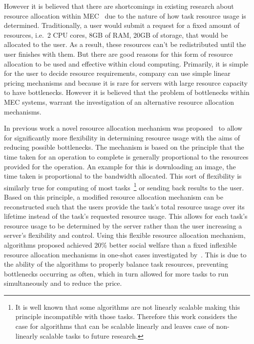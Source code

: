 However it is believed that there are shortcomings in existing research about resource allocation within
MEC~\citep{vaji_infocom, Bi2019} due to the nature of how task resource usage is determined. Traditionally,
a user would submit a request for a fixed amount of resources, i.e.\ 2 CPU cores, 8GB of RAM, 20GB of storage, that
would be allocated to the user. As a result, these resources can't be redistributed until the user finishes with them.
But there are good reasons for this form of resource allocation to be used and effective within cloud computing.
Primarily, it is simple for the user to decide resource requirements, company can use simple linear pricing mechanisms
and because it is rare for servers with large resource capacity to have bottlenecks. However it is believed that the
problem of bottlenecks within MEC systems, warrant the investigation of an alternative resource allocation mechanisms.

In previous work a novel resource allocation mechanism was proposed~\citep{FlexibleResourceAllocation} to allow for
significantly more flexibility in determining resource usage with the aims of reducing possible
bottlenecks. The mechanism is based on the principle that the time taken for an operation to complete is generally
proportional to the resources provided for the operation. An example for this is downloading an image, the time taken
is proportional to the bandwidth allocated. This sort of flexibility is similarly true for computing of most
tasks~\footnote{It is well known that some algorithms are not linearly scalable making this principle incompatible with
those tasks. Therefore this work considers the case for algorithms that can be scalable linearly and leaves case of
non-linearly scalable tasks to future research.} or sending back results to the user. \\
Based on this principle, a modified resource allocation mechanism can be
reconstructed such that the users provide the task's total resource usage over its lifetime instead of the task's
requested resource usage. This allows for each task's resource usage to be determined by the server rather than the user
increasing a server's flexibility and control. Using this flexible resource allocation mechanism, algorithms proposed
achieved 20\% better social welfare than a fixed inflexible resource allocation mechanisms in one-shot cases
investigated by~\cite{FlexibleResourceAllocation}. This is due to the ability of the algorithms to properly balance
task resources, preventing bottlenecks occurring as often, which in turn allowed for more tasks to run simultaneously
and to reduce the price.

